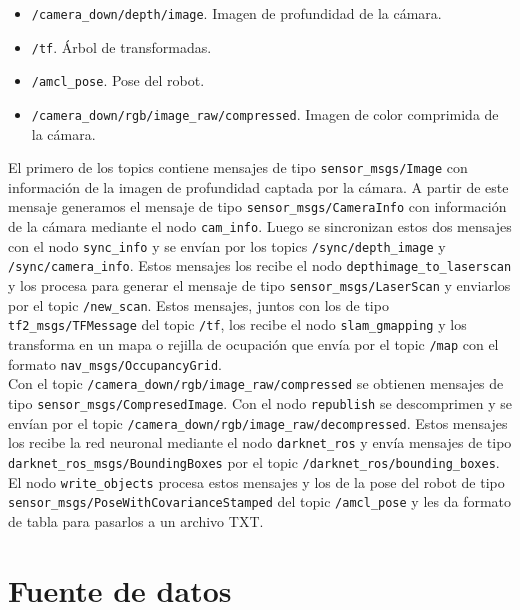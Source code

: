 \begin{itemize}

	\item \texttt{/camera\_down/depth/image}. Imagen de profundidad de la cámara.
	\item \texttt{/tf}. Árbol de transformadas.
	\item \texttt{/amcl\_pose}. Pose del robot.
	\item \texttt{/camera\_down/rgb/image\_raw/compressed}. Imagen de color comprimida de la cámara.

\end{itemize}

El primero de los topics contiene mensajes de tipo \texttt{sensor\_msgs/Image} con información de la imagen de profundidad captada por la cámara. A partir de este mensaje generamos el mensaje de tipo \texttt{sensor\_msgs/CameraInfo} con información de la cámara mediante el nodo \texttt{cam\_info}. Luego se sincronizan estos dos mensajes con el nodo \texttt{sync\_info} y se envían por los topics \texttt{/sync/depth\_image} y \texttt{/sync/camera\_info}. Estos mensajes los recibe el nodo \texttt{depthimage\_to\_laserscan} y los procesa para generar el mensaje de tipo \texttt{sensor\_msgs/LaserScan} y enviarlos por el topic \texttt{/new\_scan}. Estos mensajes, juntos con los de tipo \texttt{tf2\_msgs/TFMessage} del topic \texttt{/tf}, los recibe el nodo \texttt{slam\_gmapping} y los transforma en un mapa o rejilla de ocupación que envía por el topic \texttt{/map} con el formato \texttt{nav\_msgs/OccupancyGrid}. \\

Con el topic \texttt{/camera\_down/rgb/image\_raw/compressed} se obtienen mensajes de tipo \texttt{sensor\_msgs/CompresedImage}. Con el nodo \texttt{republish} se descomprimen y se envían por el topic \texttt{/camera\_down/rgb/image\_raw/decompressed}. Estos mensajes los recibe la red neuronal mediante el nodo \texttt{darknet\_ros} y envía mensajes de tipo \texttt{darknet\_ros\_msgs/BoundingBoxes} por el topic \texttt{/darknet\_ros/bounding\_boxes}. El nodo \texttt{write\_objects} procesa estos mensajes y los de la pose del robot de tipo \texttt{sensor\_msgs/PoseWithCovarianceStamped} del topic \texttt{/amcl\_pose} y les da formato de tabla para pasarlos a un archivo TXT.\\


\section{Fuente de datos} \label{sec:datos}

